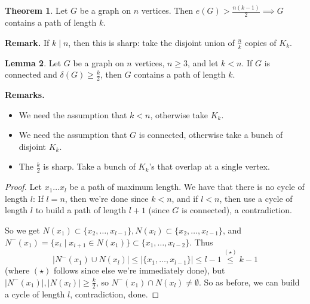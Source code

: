 \documentclass{article}
\theoremstyle{definition}
\newtheorem{theorem}{Theorem}[section]
\newtheorem{lemma}[theorem]{Lemma}
\begin{document}
\begin{theorem}\label{4.2}
    Let $G$ be a graph on $n$ vertices. Then $e(G) > \frac{n(k-1)}{2} \implies G$ contains a path of length $k$.
\end{theorem}
\textbf{Remark.} If $k \mid n$, then this is sharp: take the disjoint union of $\frac{n}{k}$ copies of $K_k$.
\begin{lemma}\label{4.3}
    Let $G$ be a graph on $n$ vertices, $n\ge 3$, and let $k<n$. If $G$ is connected and $\delta(G) \ge \frac{k}{2}$, then $G$ contains a path of length $k$.
\end{lemma}
\textbf{Remarks.}
\begin{itemize}
    \item We need the assumption that $k<n$, otherwise take $K_k$.
    \item We need the assumption that $G$ is connected, otherwise take a bunch of disjoint $K_k$.
    \item The $\frac{k}{2}$ is sharp. Take a bunch of $K_k$'s that overlap at a single vertex.
\end{itemize}
\begin{proof}
    Let $x_1\ldots x_l$ be a path of maximum length. We have that there is no cycle of length $l$: If $l=n$, then we're done since $k<n$, and if $l<n$, then use a cycle of length $l$ to build a path of length $l+1$ (since $G$ is connected), a contradiction.
    \vspace{1mm}
    
    So we get $N(x_1) \subset \{x_2,\ldots,x_{l-1}\}, N(x_l) \subset \{x_2,\ldots,x_{l-1}\}$, and $N^-(x_1) = \{x_i \mid x_{i+1} \in N(x_1)\} \subset \{x_1,\ldots,x_{l-2}\}$. Thus
    \[
    |N^-(x_1) \cup N(x_l)| \le |\{x_1,\ldots,x_{l-1}\}| \le l-1 \stackrel{(\star)}{\le} k-1 
    \]
    (where $(\star)$ follows since else we're immediately done), but $|N^-(x_1)|, |N(x_l)| \ge \frac{k}{2}$, so $N^-(x_1) \cap N(x_l) \neq \emptyset$. So as before, we can build a cycle of length $l$, contradiction, done. 
\end{proof}
\end{document}
